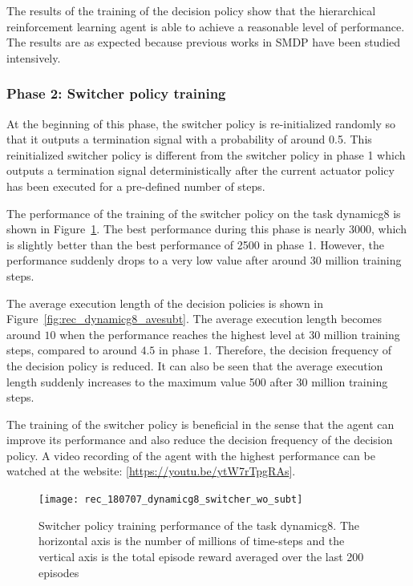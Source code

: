 The results of the training of the decision policy show that the hierarchical reinforcement learning agent is able to achieve a reasonable level of performance. The results are as expected because previous works in SMDP have been studied intensively.

\subsubsection{Phase 2: Switcher policy training}
At the beginning of this phase, the switcher policy is re-initialized randomly so that it outputs a termination signal with a probability of around 0.5. This reinitialized switcher policy is different from the switcher policy in phase 1 which outputs a termination signal deterministically after the current actuator policy has been executed for a pre-defined number of steps. 

The performance of the training of the switcher policy on the task dynamicg8 is shown in Figure~\ref{fig:rec_dynamicg8_switcher}. The best performance during this phase is nearly 3000, which is slightly better than the best performance of 2500 in phase 1. However, the performance suddenly drops to a very low value after around 30 million training steps.

The average execution length of the decision policies is shown in Figure~\ref{fig:rec_dynamicg8_avesubt}. The average execution length becomes around $10$ when the performance reaches the highest level at 30 million training steps, compared to around $4.5$ in phase 1. Therefore, the decision frequency of the decision policy is reduced. It can also be seen that the average execution length suddenly increases to the maximum value 500 after 30 million training steps.

The training of the switcher policy is beneficial in the sense that the agent can improve its performance and also reduce the decision frequency of the decision policy. A video recording of the agent with the highest performance can be watched at  the website: [\url{https://youtu.be/ytW7rTpgRAs}].

\begin{figure}[!htbp]
	\centering
	\texttt{[image: rec\_180707\_dynamicg8\_switcher\_wo\_subt]}
	\caption{Switcher policy training performance of the task dynamicg8. The horizontal axis is the number of millions of time-steps and the vertical axis is the total episode reward averaged over the last 200 episodes}
	\label{fig:rec_dynamicg8_switcher}
\end{figure}

